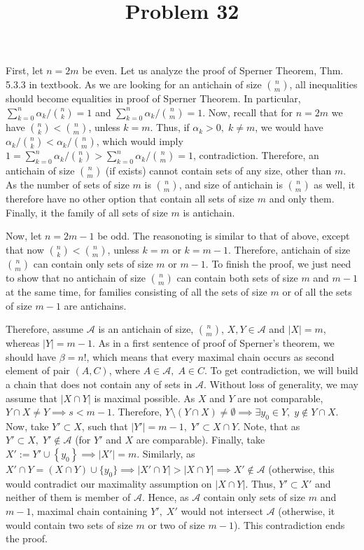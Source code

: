 \documentclass[8pt]{article} %
\title{Problem 32}
\newcommand{\myabs}[1]{\left|#1\right|}
\let\oldsum\sum
\renewcommand*{\sum}{\displaystyle\oldsum}
\begin{document}
\maketitle
First, let $n=2m$ be even. Let us analyze the proof of Sperner Theorem, Thm. 5.3.3 in textbook. As we are looking for an antichain of size $\binom{n}{m}$, all inequalities should become equalities in proof of Sperner Theorem. In 
particular, $\sum_{k=0}^n \alpha_k/\binom{n}{k}=1$ and $\sum_{k=0}^n \alpha_{k}/\binom{n}{m}=1$. Now, recall that for $n=2m$ we have
$\binom{n}{k}<\binom{n}{m}$, unless $k=m$. Thus, if $\alpha_k>0,\;k\neq m$, we would have
$\alpha_k/\binom{n}{k}<\alpha_k/\binom{n}{m}$, which would imply $1=\sum_{k=0}^n \alpha_k/\binom{n}{k}>\sum_{k=0}^n \alpha_{k}/\binom{n}{m}=1$, contradiction. Therefore, an antichain of size $\binom{n}{m}$ (if exists) cannot contain
sets of any size, other than $m$. As the number of sets of size $m$ is $\binom{n}{m}$, and size of antichain is $\binom{n}{m}$ as well, it therefore have no other option that contain all sets of size $m$ and only them. Finally, it
the family of all sets of size $m$ is antichain.

Now, let $n=2m-1$ be odd. The reasonoting is similar to that of above, except that now $\binom{n}{k}<\binom{n}{m}$, unless $k=m$ or $k=m-1$. Therefore, antichain of size $\binom{n}{m}$ can contain only sets of size $m$ or $m-1$.
To finish the proof, we just need to show that no antichain of size $\binom{n}{m}$ can contain both sets of size $m$ and $m-1$ at the same time, for families consisting of all the sets of size $m$ or of all the sets of size $m-1$ are
antichains.

Therefore, assume $\mathcal{A}$ is an antichain of size, $\binom{n}{m}$, $X,Y\in\mathcal{A}$ and $\myabs{X}=m$, whereas $\myabs{Y}=m-1$. As in a first sentence of proof of Sperner's theorem, we should have $\beta=n!$,
which means that every maximal chain occurs as second element of pair $(A,C)$, where $A\in\mathcal{A},\;A\in C$. To get contradiction, we will build a chain that does not contain any of sets in $\mathcal{A}$. Without loss of
generality, we may assume that $\myabs{X\cap Y}$ is maximal possible. As $X$ and $Y$ are not comparable, $Y\cap X\neq Y\implies s<m-1$. Therefore, $Y\setminus \left(Y\cap X\right)
\neq \emptyset\implies \exists y_0\in Y,\;y\notin Y\cap X$.
Now, take $Y' \subset X$, such that $\myabs{Y'}=m-1,\;Y' \subset X\cap Y$. Note, that as $Y'\subset X,\;Y'\notin\mathcal{A}$ (for $Y'$ and $X$ are comparable). Finally, take $X':=Y'\cup\left\{y_0\right\}\implies\myabs{X'}=m$. Similarly,
as $X'\cap Y=\left(X\cap Y\right)\cup \{y_0\}\implies \myabs{X'\cap Y}>\myabs{X\cap Y}\implies X'\notin\mathcal{A}$ (otherwise, this would contradict our maximality assumption on $\myabs{X\cap Y}$. Thus, $Y'\subset X'$ and neither
of them is member of $\mathcal{A}$. Hence, as $\mathcal{A}$ contain only sets of size $m$ and $m-1$, maximal chain containing $Y',\;X'$ would not intersect $\mathcal{A}$ (otherwise, it would contain two sets of size $m$ or two of
size $m-1$). This contradiction ends the proof.
\end{document}
